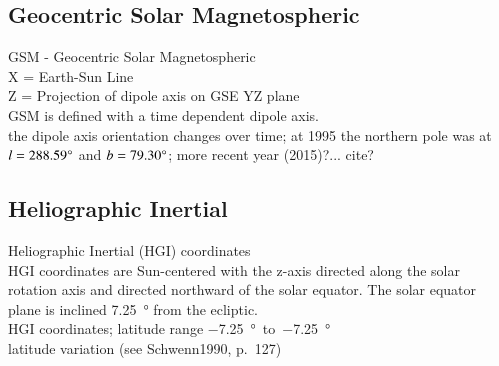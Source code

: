\subsection{Geocentric Solar Magnetospheric}

GSM - Geocentric Solar Magnetospheric\\
X = Earth-Sun Line\\
Z = Projection of dipole axis on GSE YZ plane\\

GSM is defined with a time dependent dipole axis.\\
the dipole axis orientation changes over time; at 1995 the northern pole was at $l = 288.59\degree$ and $b = 79.30\degree$; more recent year (2015)?... cite?\\

\subsection{Heliographic Inertial}

Heliographic Inertial (HGI) coordinates\\
HGI coordinates are Sun-centered with the z-axis directed along the solar rotation axis and directed northward of the solar equator. The solar equator plane is inclined \SI{7.25}{\degree} from the ecliptic.\\

HGI coordinates; latitude range \SI{-7.25}{\degree}~to~\SI{-7.25}{\degree}\\
latitude variation (see Schwenn1990, p.~127)\\
